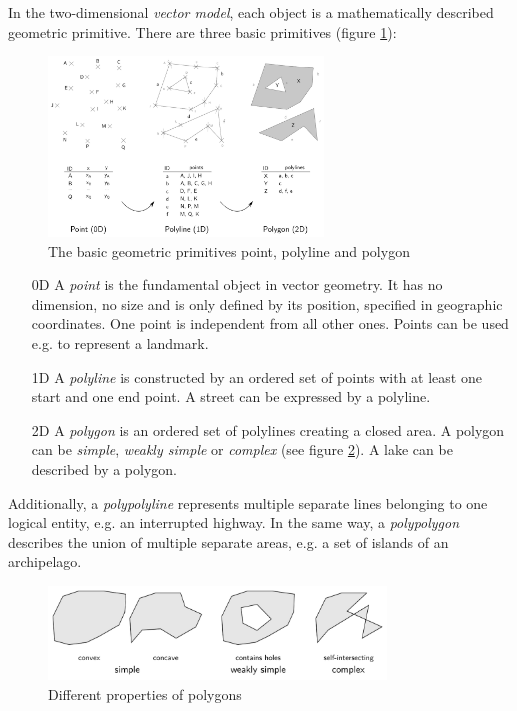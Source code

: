In the two-dimensional \emph{vector model}, each object is a mathematically described geometric primitive. There are three basic primitives (figure \ref{fig:geometric_primitives}):

\begin{figure}[H]
  \centering
  \includegraphics[width=0.65\textwidth]{graphics/basics/geometric_primitives}
  \caption{The basic geometric primitives point, polyline and polygon}
  \label{fig:geometric_primitives}
\end{figure}

\begin{enumerate}
  \item[0D] A \emph{point} is the fundamental object in vector geometry. It has no dimension, no size and is only defined by its position, specified in geographic coordinates. One point is independent from all other ones. Points can be used e.g. to represent a landmark.
  \item[1D] A \emph{polyline} is constructed by an ordered set of points with at least one start and one end point. A street can be expressed by a polyline.
  \item[2D] A \emph{polygon} is an ordered set of polylines creating a closed area. A polygon can be \emph{simple}, \emph{weakly simple} or \emph{complex} (see figure \ref{fig:polygon_properties}). A lake can be described by a polygon.
\end{enumerate}

Additionally, a \emph{polypolyline} represents multiple separate lines belonging to one logical entity, e.g. an interrupted highway. In the same way, a \emph{polypolygon} describes the union of multiple separate areas, e.g. a set of islands of an archipelago.

\begin{figure}[H]
  \centering
  \includegraphics[width=0.8\textwidth]{graphics/basics/polygon_properties}
  \caption{Different properties of polygons}
  \label{fig:polygon_properties}
\end{figure}

